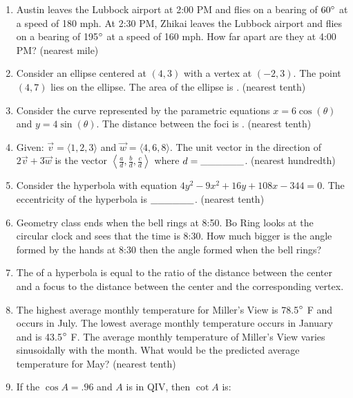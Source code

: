 \documentclass[../uilmath.tex]{subfiles}
\begin{document}
\begin{enumerate}[label=\bfseries\arabic*.]
    \item %
    Austin leaves the Lubbock airport at 2:00 PM and flies on a bearing of $60\degree$ at a speed of 180 mph. At 2:30 PM, Zhikai 
    leaves the Lubbock airport and flies on a bearing of 195$\degree$ at a speed of 160 mph. How far apart are they at 4:00 PM? (nearest mile)

    \item %
    Consider an ellipse centered at $(4,3)$ with a vertex at $(-2,3)$. The point $(4,7)$ lies on the ellipse.
    The area of the ellipse is \blank. (nearest tenth)

    \item %
    Consider the curve represented by the parametric equations $x=6\cos(\theta)$ and $y=4\sin(\theta)$. The 
    distance between the foci is \blank. (nearest tenth)

    \item %
    Given: $\vec{v}=\langle 1,2,3 \rangle$ and $\vec{w}=\langle 4,6,8\rangle$. The unit vector in the direction of 
    $2\vec{v}+3\vec{w}$ is the vector $\left\langle \frac{a}{d}, \frac{b}{d}, \frac{c}{d}\right\rangle$ where $d=\_\_\_\_\_\_$. (nearest hundredth)

    \item %
    Consider the hyperbola with equation $4y^2-9x^2+16y+108x-344=0$. The eccentricity of the hyperbola is $\_\_\_\_\_\_$. (nearest tenth)

    \item %
    Geometry class ends when the bell rings at 8:50. Bo Ring looks at the circular clock and sees that the time is 8:30. How much bigger is the angle formed 
    by the hands at 8:30 then the angle formed when the bell rings?

    \item %
    The \blank of a hyperbola is equal to the ratio of the distance between the center and a focus 
    to the distance between the center and the corresponding vertex.

    \item %
    The highest average monthly temperature for Miller's View is 78.5$\degree$ F and occurs in July. The lowest average 
    monthly temperature occurs in January and is 43.5$\degree$ F. The average monthly temperature 
    of Miller's View varies sinusoidally with the month. What would be the predicted average temperature for May? (nearest tenth)

    \item %
    If the $\cos A = .96$ and $A$ is in QIV, then $\cot A$ is: 


\end{enumerate}
\end{document}
